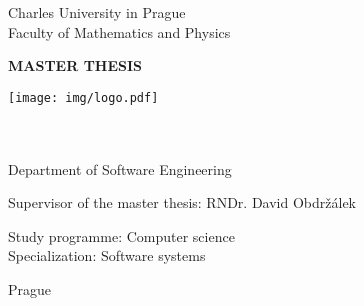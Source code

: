 \begin{titlingpage}
\begin{center}

\vspace{15mm}

\large
Charles University in Prague\\
Faculty of Mathematics and Physics\\

\vspace{10mm}

{\Large\textbf{MASTER THESIS}}

\vspace{20mm}

\texttt{[image: img/logo.pdf]} 

\vspace{20mm}

{\Large\theauthor}\\
\vspace{5mm}
{\Large\textbf{\thetitle}}\\
\vspace{5mm}
Department of Software Engineering\\
\vspace{20mm}

\large
\noindent Supervisor of the master thesis: RNDr. David Obdržálek
\vspace{1mm} 

\noindent Study programme: Computer science \\
Specialization: Software systems

\vspace{20mm}

Prague \the\year
\end{center}

\end{titlingpage}

\movetooddpage

